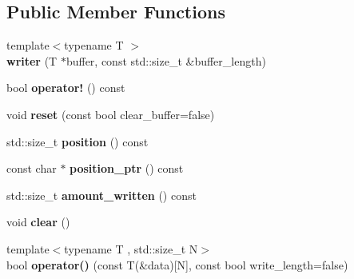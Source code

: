 \subsection*{Public Member Functions}
\begin{DoxyCompactItemize}
\item 
\hypertarget{classstrtk_1_1binary_1_1writer_a0d2d0dfabf63612ba219f96c1b07acd1}{{\footnotesize template$<$typename T $>$ }\\{\bfseries writer} (T $\ast$buffer, const std\-::size\-\_\-t \&buffer\-\_\-length)}\label{classstrtk_1_1binary_1_1writer_a0d2d0dfabf63612ba219f96c1b07acd1}

\item 
\hypertarget{classstrtk_1_1binary_1_1writer_aa7592a5122aacfd1d91b1241f01265cd}{bool {\bfseries operator!} () const }\label{classstrtk_1_1binary_1_1writer_aa7592a5122aacfd1d91b1241f01265cd}

\item 
\hypertarget{classstrtk_1_1binary_1_1writer_ad46f5bbb6ca3c7d367ce40360c88e228}{void {\bfseries reset} (const bool clear\-\_\-buffer=false)}\label{classstrtk_1_1binary_1_1writer_ad46f5bbb6ca3c7d367ce40360c88e228}

\item 
\hypertarget{classstrtk_1_1binary_1_1writer_a577e052fb9656e28264f56baba246dd9}{std\-::size\-\_\-t {\bfseries position} () const }\label{classstrtk_1_1binary_1_1writer_a577e052fb9656e28264f56baba246dd9}

\item 
\hypertarget{classstrtk_1_1binary_1_1writer_a2dcf6a96a8a7b0e43818f3ef2d9070db}{const char $\ast$ {\bfseries position\-\_\-ptr} () const }\label{classstrtk_1_1binary_1_1writer_a2dcf6a96a8a7b0e43818f3ef2d9070db}

\item 
\hypertarget{classstrtk_1_1binary_1_1writer_a78543f9dfff6ed3e5720cf66eb3dd73b}{std\-::size\-\_\-t {\bfseries amount\-\_\-written} () const }\label{classstrtk_1_1binary_1_1writer_a78543f9dfff6ed3e5720cf66eb3dd73b}

\item 
\hypertarget{classstrtk_1_1binary_1_1writer_a15507fb7f155fc8a08e2595f0a4136e5}{void {\bfseries clear} ()}\label{classstrtk_1_1binary_1_1writer_a15507fb7f155fc8a08e2595f0a4136e5}

\item 
\hypertarget{classstrtk_1_1binary_1_1writer_a47341899c73ddff995123ebce695653f}{{\footnotesize template$<$typename T , std\-::size\-\_\-t N$>$ }\\bool {\bfseries operator()} (const T(\&data)\mbox{[}N\mbox{]}, const bool write\-\_\-length=false)}\label{classstrtk_1_1binary_1_1writer_a47341899c73ddff995123ebce695653f}


\end{DoxyCompactItemize}
